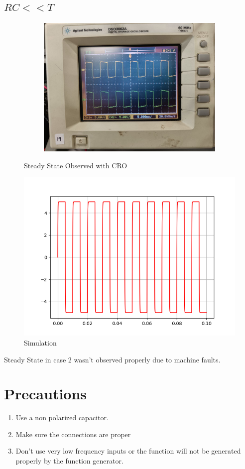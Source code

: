 \documentclass[journal]{IEEEtran}
\begin{document}
\subsection{$RC << T$}

\begin{figure}[H]
    \centering
    \begin{subfigure}[t]{0.4\textwidth}
        \centering
        \includegraphics[width=1\columnwidth]{pics/6109622319392604814.jpg}
    \end{subfigure}
    \caption{Steady State Observed with CRO}
\end{figure}

\begin{figure}[H]
    \centering
    \includegraphics[width=0.6\columnwidth]{figs/fig2.png}
    \caption{Simulation}
\end{figure}

Steady State in case 2 wasn't observed properly due to machine faults.
 
\section{Precautions}

\begin{enumerate}
    \item Use a non polarized capacitor.
    \item Make sure the connections are proper
    \item Don't use very low frequency inputs or the function will not be generated properly by the function generator.
\end{enumerate}
\end{document}
